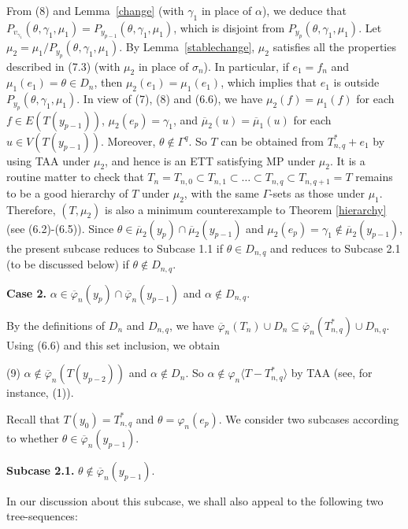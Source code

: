 \documentclass[11pt]{article}
\newcommand{\phibar}{\overline{\varphi}}
\begin{document}
\noindent From (8) and Lemma~\ref{change} (with $\gamma_1$ in place of $\alpha$), we deduce that  $P_{v_{\gamma_{1}}}(\theta,\gamma_{1},\mu_1)=P_{y_{p-1}}(\theta,\gamma_{1},\mu_1)$, which is disjoint from 
$P_{y_{p}}(\theta,\gamma_{1},\mu_1)$. Let $\mu_2=\mu_1/P_{y_{p}}(\theta,\gamma_{1},\mu_1)$. By Lemma~\ref{stablechange},  
$\mu_2$ satisfies all the properties described in (7.3) (with $\mu_2$ in place of $\sigma_n$). 
In particular, if $e_1=f_n$ and $\mu_1(e_1)=\theta \in D_n$, then $\mu_2(e_1)=\mu_1(e_1)$, which 
implies that $e_1$ is outside $P_{y_{p}}(\theta,\gamma_{1},\mu_1)$. In view of (7), (8) and (6.6),
we have $\mu_2(f)=\mu_1(f)$ for each $f\in E(T(y_{p-1}))$, $\mu_2(e_p)=\gamma_1$, and $\overline{\mu}_2(u)=
\overline{\mu}_1(u)$ for each $u\in V(T(y_{p-1}))$. Moreover, $\theta \notin \Gamma^q$. So $T$ can be obtained 
from $T_{n,q}^*+e_1$ by using TAA under $\mu_2$, and hence is an ETT satisfying MP under $\mu_2$. It is a routine 
matter to check that $T_n=T_{n,0} \subset T_{n,1} \subset \ldots \subset T_{n,q} \subset T_{n,q+1}=T$ remains to 
be a good hierarchy of $T$ under $\mu_2$, with the same $\Gamma$-sets as those under $\mu_1$. 
Therefore, $(T, \mu_2)$ is also a minimum counterexample to Theorem 
\ref{hierarchy} (see (6.2)-(6.5)). Since $\theta \in \overline{\mu}_2(y_p)\cap \overline{\mu}_2(y_{p-1})$
and $\mu_2(e_p)= \gamma_1 \notin \overline{\mu}_2(y_{p-1})$, the present subcase reduces to Subcase 1.1 if 
$\theta\in D_{n,q}$ and reduces to Subcase 2.1 (to be discussed below) if $\theta\notin D_{n,q}$. 

\vskip 2mm

{\bf Case 2.} $\alpha\in \phibar_n(y_p)\cap \phibar_n(y_{p-1})$ and $\alpha\notin D_{n,q}$. 

\vskip 1mm
By the definitions of $D_n$ and $D_{n,q}$, we have $\overline{\varphi}_n(T_n) \cup D_n \subseteq  
\overline{\varphi}_n(T_{n,q}^*) \cup D_{n,q}$. Using (6.6) and this set inclusion, we obtain 

(9) $\alpha \notin  \overline{\varphi}_n(T(y_{p-2}))$ and $\alpha \notin D_n$. So $\alpha \notin\varphi_n \langle 
T-T_{n,q}^* \rangle$ by TAA (see, for instance, (1)).

Recall that $T(y_0)=T_{n,q}^*$ and $\theta=\varphi_n(e_p)$. We consider two subcases according to whether $\theta  \in \overline{\varphi}_n(y_{p-1})$.

{\bf Subcase 2.1.} $\theta  \notin\overline{\varphi}_n(y_{p-1})$.

In our discussion about this subcase, we shall also appeal to the following two tree-sequences:
\end{document}
